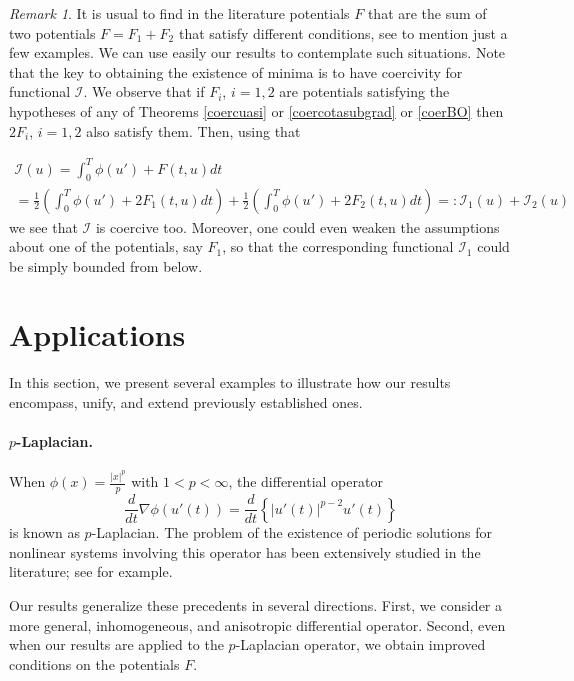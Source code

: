 \documentclass[twoside]{article}
\theoremstyle{definition}
\theoremstyle{plain}
\theoremstyle{remark}
\newtheorem{remark}{Remark}[section]
\begin{document}
\begin{remark}\label{obsumapotenciales}
 It is usual to find in the literature potentials $F$ that are the sum of two potentials $F=F_1+F_2$ that satisfy different conditions, see \cite{Tang2010,pacsca2007periodic} to mention just a few examples. We can use easily our results to contemplate such situations.  Note that the key to obtaining the existence of minima is to have coercivity for functional $\mathcal{I}$.
 We observe that if $F_i$, $i=1,2$ are  potentials  satisfying the hypotheses of any of Theorems \ref{coercuasi} or \ref{coercotasubgrad} or \ref{coerBO} then $2F_i$, $i=1,2$  also satisfy them.  Then, using that

 \begin{multline*}
   \mathcal{I}(u)=  \int_0^T\phi(u')+F(t,u)dt\\=\frac12\left(\int_0^T\phi(u')+2F_1(t,u)dt\right)+\frac12\left(\int_0^T\phi(u')+2F_2(t,u)dt  \right)=:\mathcal{I}_1(u)+\mathcal{I}_2(u)
 \end{multline*}
 we see that $\mathcal{I}$ is coercive too. Moreover, one could even weaken the assumptions about one of the potentials, say $F_1$, so that the corresponding functional $\mathcal{I}_1$ could be simply bounded from below.
\end{remark}



\section{Applications}\label{sec:applications}
In this section, we present several examples to illustrate how our results encompass, unify, and extend previously established ones.

\paragraph{$p$-Laplacian.}
When $\phi(x)= \frac{|x|^p}{p}$ with $1<p<\infty$, the differential operator \[\frac{d}{dt} \nabla\phi(u'(t))= \frac{d}{dt} \left\{|u'(t)|^{p-2}u'(t)\right\}\] is known as $p$-Laplacian. The problem of the existence of periodic solutions for nonlinear systems involving this operator has been extensively studied in the literature; see
\cite{pacsca2007periodic,lian2017periodic,li2015infinitely,zhang2012non,Tang2010,xu2007some,tian2007periodic,ma2009existence,Ning2015} for example.

Our results generalize these precedents in several directions. First, we consider a more general, inhomogeneous, and anisotropic differential operator. Second, even when our results are applied to the $p$-Laplacian operator, we obtain improved conditions on the potentials $F$.
\end{document}
